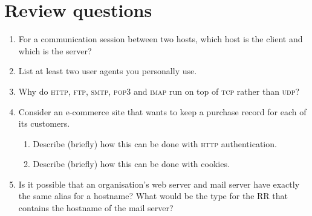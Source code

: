 \documentclass[12pt,a4paper]{article}
\begin{document}
\section{Review questions}

\begin{enumerate}

  \item For a communication session between two hosts, which host is
    the client and which is the server?

  \item List at least two user agents you personally use.

  \item Why do \textsc{http}, \textsc{ftp}, \textsc{smtp},
    \textsc{pop3} and \textsc{imap} run on top of \textsc{tcp} rather
    than \textsc{udp}?

  \item Consider an e-commerce site that wants to keep a purchase
    record for each of its customers. 
  \begin{enumerate}

    \item Describe (briefly) how this can be done with \textsc{http}
      authentication. 

    \item Describe (briefly) how this can be done with cookies.

  \end{enumerate}

  \item Is it possible that an organisation's web server and mail
    server have exactly the same alias for a hostname? What would be
    the type for the RR that contains the hostname of the mail server?

\end{enumerate}
\end{document}
